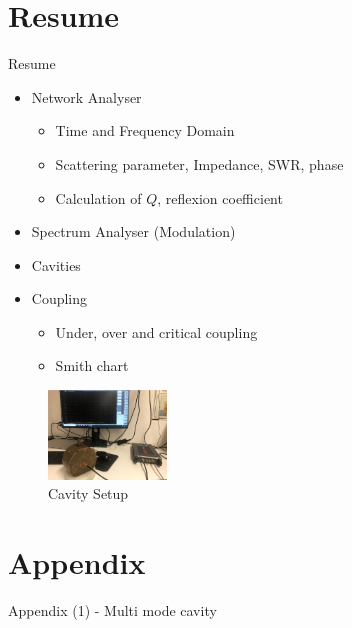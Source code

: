 \documentclass{beamer}
\begin{document}
\section{Resume}
\begin{frame}[t,fragile]{Resume}
\begin{itemize}
\item Network Analyser
\begin{itemize}
\item Time and Frequency Domain
\item Scattering parameter, Impedance, SWR, phase
\item Calculation of $Q$, reflexion coefficient
\end{itemize}
\item Spectrum Analyser (Modulation)

\item Cavities
\item Coupling
\begin{itemize}
\item Under, over and critical coupling  
\item Smith chart
\end{itemize}
\end{itemize}
\begin{figure}
  \centering
  \includegraphics[width=0.28\textwidth]{4_resume}
  \caption{Cavity Setup}
\end{figure}
\end{frame}

\section{Appendix}
\begin{frame}[t,fragile]{Appendix (1) - Multi mode cavity}
\begin{figure}
  \centering\setcounter{subfigure}{0}
  \quad
  \\
\end{figure}
\end{frame}
\end{document}
